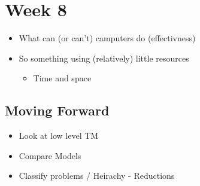 \documentclass[11pt]{article}
\begin{document}
\section{Week 8}
\label{sec:orgfb9aea8}
\begin{itemize}
\item What can (or can't) camputers do (effectivness)
\item So something using (relatively) little resources
\begin{itemize}
\item Time and space
\end{itemize}
\end{itemize}
\subsection{Moving Forward}
\label{sec:org0d38eb9}
\begin{itemize}
\item Look at low level TM
\item Compare Models
\item Classify problems / Heirachy - Reductions
\end{itemize}
\end{document}
